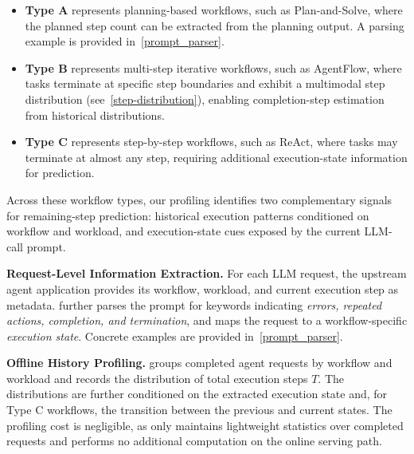 \begin{itemize}[leftmargin=10pt]\label{type-describe}
    \item \textbf{Type A} represents planning-based workflows, such as Plan-and-Solve, where the planned step count can be extracted from the planning output. %
    A parsing example is provided in~\autoref{prompt_parser}.
    \item \textbf{Type B} represents multi-step iterative workflows, such as AgentFlow, where tasks terminate at specific step boundaries and exhibit a multimodal step distribution (see~\autoref{step-distribution}), enabling completion-step  estimation from historical distributions.
    \item \textbf{Type C} represents step-by-step workflows, such as ReAct, where tasks may terminate at almost any step, requiring additional execution-state information for prediction.
\end{itemize}
Across these workflow types, our profiling identifies two complementary signals for remaining-step prediction: historical execution patterns conditioned on workflow and workload, and execution-state cues exposed by the current LLM-call prompt.

\textbf{Request-Level Information Extraction.}
For each LLM request, the upstream agent application provides its workflow, workload, and current execution step as metadata. 
\sysname further parses the prompt for keywords indicating {\em errors, repeated actions, completion, and termination}, and maps the request to a workflow-specific {\em execution state}.
Concrete examples are provided in~\autoref{prompt_parser}.

\textbf{Offline History Profiling.}
\sysname groups completed agent requests by workflow and workload and records the distribution of total execution steps $T$. 
The distributions are further conditioned on the extracted execution state and, for Type C workflows, the transition between the previous and current states.
The profiling cost is negligible, as \sysname only maintains lightweight statistics over completed requests and performs no additional computation on the online serving path.

